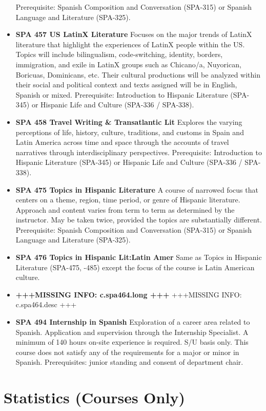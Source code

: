 \documentclass[
  letterpaper,
]{scrbook}
\begin{document}
\begin{itemize}
  Prerequisite: Spanish Composition and Conversation (SPA-315) or
  Spanish Language and Literature (SPA-325).
\item
  \textbf{SPA 457 US LatinX Literature} Focuses on the major trends of
  LatinX literature that highlight the experiences of LatinX people
  within the US. Topics will include bilingualism, code-switching,
  identity, borders, immigration, and exile in LatinX groups such as
  Chicano/a, Nuyorican, Boricuas, Dominicans, etc. Their cultural
  productions will be analyzed within their social and political context
  and texts assigned will be in English, Spanish or mixed. Prerequisite:
  Introduction to Hispanic Literature (SPA-345) or Hispanic Life and
  Culture (SPA-336 / SPA-338).
\item
  \textbf{SPA 458 Travel Writing \& Transatlantic Lit} Explores the
  varying perceptions of life, history, culture, traditions, and customs
  in Spain and Latin America across time and space through the accounts
  of travel narratives through interdisciplinary perspectives.
  Prerequisite: Introduction to Hispanic Literature (SPA-345) or
  Hispanic Life and Culture (SPA-336 / SPA-338).
\item
  \textbf{SPA 475 Topics in Hispanic Literature} A course of narrowed
  focus that centers on a theme, region, time period, or genre of
  Hispanic literature. Approach and content varies from term to term as
  determined by the instructor. May be taken twice, provided the topics
  are substantially different. Prerequisite: Spanish Composition and
  Conversation (SPA-315) or Spanish Language and Literature (SPA-325).
\item
  \textbf{SPA 476 Topics in Hispanic Lit:Latin Amer} Same as Topics in
  Hispanic Literature (SPA-475, -485) except the focus of the course is
  Latin American culture.
\item
  \textbf{+++MISSING INFO: c.spa464.long +++} +++MISSING INFO:
  c.spa464.desc +++
\item
  \textbf{SPA 494 Internship in Spanish} Exploration of a career area
  related to Spanish. Application and supervision through the Internship
  Specialist. A minimum of 140 hours on-site experience is required. S/U
  basis only. This course does not satisfy any of the requirements for a
  major or minor in Spanish. Prerequisites: junior standing and consent
  of department chair.
\end{itemize}

\hypertarget{statistics-courses-only}{%
\section{Statistics (Courses Only)}\label{statistics-courses-only}}
\end{document}

